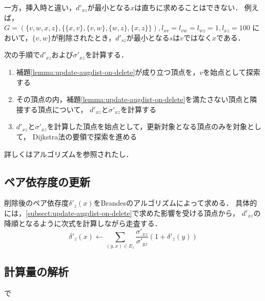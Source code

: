 一方，挿入時と違い，$d'_{xz}$が最小となる$x$は直ちに求めることはできない．
例えば，$G=(\{v,w,x,z\},\{\{x,v\},\{v,w\},\{w,z\},\{x,z\}\}),l_{xv}=l_{vw}=l_{wz}=1,l_{xz}=100$
において，$\{v,w\}$が削除されたとき，$d'_{sz}$が最小となる$s$は$v$ではなく$x$である．

次の手順で$d'_{xz}$および$\sigma'_{xz}$を計算する．
\begin{enumerate}
\item 補題\ref{lemma:update-augdist-on-delete}が成り立つ頂点を，$v$を始点として探索する
\item その頂点の内，補題\ref{lemma:update-augdist-on-delete}を満たさない頂点と隣接する頂点について，
  $d'_{xz}$と$\sigma'_{xz}$を計算する
\item $d'_{xz}$と$\sigma'_{xz}$を計算した頂点を始点として，更新対象となる頂点のみを対象として，
  Dijkstra法の要領で探索を進める
\end{enumerate}
詳しくはアルゴリズムを参照されたし．

\subsection{ペア依存度の更新}
\label{subsect:update-delta-on-delete}

削除後のペア依存度$\delta'_z(x)$をBrandesのアルゴリズムによって求める．
具体的には，\ref{subsect:update-augdist-on-delete}で求めた影響を受ける頂点から，
$d'_{xz}$の降順となるように次式を計算しながら走査する．
\[ \delta'_{z}(x)\gets\sum_{(y,x)\in E_z}\frac{\sigma'_{xz}}{\sigma'_{yz}}(1+\delta'_z(y)) \]

\subsection{計算量の解析}
\label{subsect:computational-complexity-of-decremental-algorithm}で

